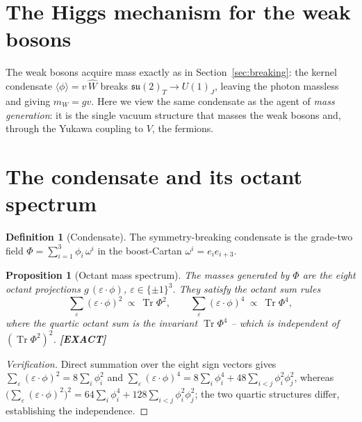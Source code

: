\documentclass[11pt,oneside]{book}
\newcommand{\Wh}{\hat{W}}                         %
\newcommand{\Tr}{\operatorname{Tr}}
\newcommand{\su}{\mathfrak{su}}
\newcommand{\status}[1]{{\sffamily\bfseries\color{statuscol}[#1]}}
\theoremstyle{plain}
\newtheorem{proposition}[theorem]{Proposition}
\theoremstyle{definition}
\newtheorem{definition}[theorem]{Definition}
\theoremstyle{remark}
\begin{document}
\section{The Higgs mechanism for the weak bosons}
\label{sec:higgs}

The weak bosons acquire mass exactly as in Section~\ref{sec:breaking}: the kernel
condensate $\langle\phi\rangle=v\,\Wh$ breaks $\su(2)_T\to U(1)_J$, leaving the
photon massless and giving $m_W=gv$. Here we view the same condensate as the agent
of \emph{mass generation}: it is the single vacuum structure that masses the weak
bosons and, through the Yukawa coupling to $V$, the fermions.

\section{The condensate and its octant spectrum}
\label{sec:condensate}

\begin{definition}[Condensate]
\label{def:condensate}
The symmetry-breaking condensate is the grade-two field
$\Phi=\sum_{i=1}^{3}\phi_i\,\omega^i$ in the boost-Cartan
$\omega^i=e_ie_{i+3}$.
\end{definition}

\begin{proposition}[Octant mass spectrum]
\label{prop:octant-spectrum}
The masses generated by $\Phi$ are the eight octant projections
$g\,(\varepsilon\!\cdot\!\phi)$, $\varepsilon\in\{\pm1\}^3$. They satisfy the octant
sum rules
\[
  \sum_{\varepsilon}(\varepsilon\!\cdot\!\phi)^2\ \propto\ \Tr\Phi^2,
  \qquad
  \sum_{\varepsilon}(\varepsilon\!\cdot\!\phi)^4\ \propto\ \Tr\Phi^4,
\]
where the quartic octant sum is the invariant $\Tr\Phi^4$ -- which is
\emph{independent} of $(\Tr\Phi^2)^2$. \status{EXACT}
\end{proposition}

\begin{proof}[Verification]
Direct summation over the eight sign vectors gives
$\sum_\varepsilon(\varepsilon\!\cdot\!\phi)^2=8\sum_i\phi_i^2$ and
$\sum_\varepsilon(\varepsilon\!\cdot\!\phi)^4=8\sum_i\phi_i^4
+48\sum_{i<j}\phi_i^2\phi_j^2$, whereas
$\bigl(\sum_\varepsilon(\varepsilon\!\cdot\!\phi)^2\bigr)^2
=64\sum_i\phi_i^4+128\sum_{i<j}\phi_i^2\phi_j^2$; the two quartic structures differ,
establishing the independence.
\end{proof}
\end{document}
